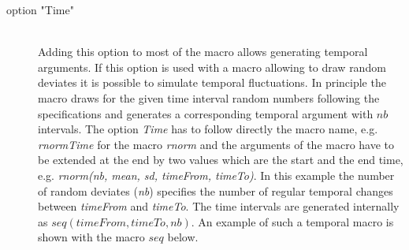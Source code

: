 \documentclass[letterpaper,12pt,oneside]{book}
\begin{document}
\begin{description}
\item[option "Time"]\hspace*{\fill}\\
Adding this option to most of the macro allows generating temporal arguments. If this option is used with a macro allowing to draw random deviates it is possible to simulate temporal fluctuations. In principle the macro draws for the given time interval random numbers following the specifications and generates a corresponding temporal argument with $nb$ intervals. The option \textit{Time} has to follow directly the macro name, e.g. \textit{rnormTime} for the macro \textit{rnorm} and the arguments of the macro have to be extended at the end by two values which are the start and the end time, e.g. \textit{rnorm(nb, mean, sd, timeFrom, timeTo)}. In this example the number of random deviates (\textit{nb}) specifies the number of regular temporal changes between \textit{timeFrom} and \textit{timeTo}. The time intervals are generated internally as $seq(timeFrom, timeTo, nb)$. An example of such a temporal macro is shown with the macro $seq$ below.


\end{description}
\end{document}

